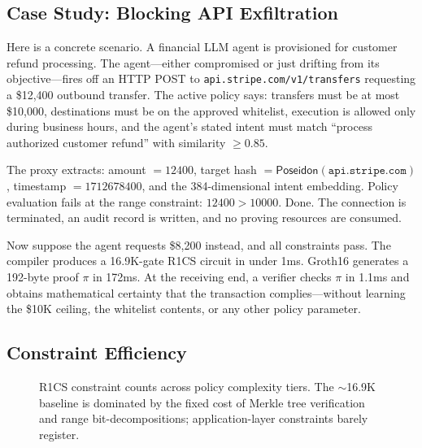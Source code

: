 \documentclass[10pt,conference]{IEEEtran}
\begin{document}
\subsection{Case Study: Blocking API Exfiltration}
\label{sec:casestudy}

Here is a concrete scenario. A financial LLM agent is provisioned for customer refund processing. The agent---either compromised or just drifting from its objective---fires off an HTTP POST to \texttt{api.stripe.com/v1/transfers} requesting a \$12,400 outbound transfer. The active policy says: transfers must be at most \$10,000, destinations must be on the approved whitelist, execution is allowed only during business hours, and the agent's stated intent must match ``process authorized customer refund'' with similarity $\geq 0.85$.

The proxy extracts: amount $= 12400$, target hash $= \textsf{Poseidon}(\texttt{api.stripe.com})$, timestamp $= 1712678400$, and the 384-dimensional intent embedding. Policy evaluation fails at the range constraint: $12400 > 10000$. Done. The connection is terminated, an audit record is written, and no proving resources are consumed.

Now suppose the agent requests \$8,200 instead, and all constraints pass. The compiler produces a 16.9K-gate R1CS circuit in under 1ms. Groth16 generates a 192-byte proof $\pi$ in 172ms. At the receiving end, a verifier checks $\pi$ in 1.1ms and obtains mathematical certainty that the transaction complies---without learning the \$10K ceiling, the whitelist contents, or any other policy parameter.

\subsection{Constraint Efficiency}

\begin{figure}[t]
\centering
{}
\caption{R1CS constraint counts across policy complexity tiers. The $\sim$16.9K baseline is dominated by the fixed cost of Merkle tree verification and range bit-decompositions; application-layer constraints barely register.}
\label{fig:constraints}
\end{figure}
\end{document}
